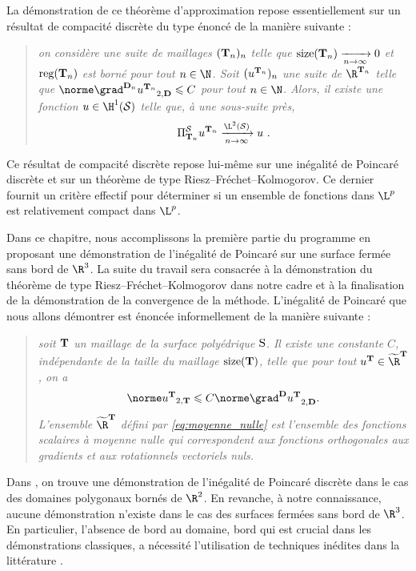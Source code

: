 La démonstration de ce théorème d'approximation repose essentiellement sur un résultat de compacité discrète du type \cite[Lemma 3.6]{andreianov_discrete_2007} énoncé de la manière suivante :
\begin{quote}
\textsl{on considère une suite de maillages $(\mathbf{T}_n)_n$ telle que $\operatorname{size}(\mathbf{T}_n) \xrightarrow[n \to \infty]{} 0$ et $\operatorname{reg}(\mathbf{T}_n)$ est borné pour tout $n \in \N$. Soit $(u^{\mathbf{T}_n})_n$ une suite de $\R^{\ensddfvplat_n}$ telle que $\normeddfvD{\grad^{\ensdiamantplat_n} u^{\ensddfvplat_n}} \leqslant C$ pour tout $n \in \N$. Alors, il existe une fonction $u \in \H^1(\surflisse)$ telle que, à une sous-suite près,
\[
\Pi^\surflisse_{\ensddfvplat_n} u^{\ensddfvplat_n} \xrightarrow[n \to \infty]{\L^2(\surflisse)} u\ .
\]
}
\end{quote}
Ce résultat de compacité discrète repose lui-même sur une inégalité de Poincaré discrète et sur un théorème de type Riesz--Fréchet--Kolmogorov. Ce dernier fournit un critère effectif pour déterminer si un ensemble de fonctions dans $\L^p$ est relativement compact dans $\L^p$. 

Dans ce chapitre, nous accomplissons la première partie du programme en proposant une démonstration de l'inégalité de Poincaré \ddfv sur une surface fermée sans bord de $\R^3$. La suite du travail sera consacrée à la démonstration du théorème de type Riesz--Fréchet--Kolmogorov dans notre cadre et à la finalisation de la démonstration de la convergence de la méthode. L'inégalité de Poincaré que nous allons démontrer est énoncée informellement de la manière suivante :
\begin{quote}
\textsl{soit $\mathbf{T}$ un maillage \ddfv de la surface polyédrique $\mathrm{S}$. Il existe une constante $C$, indépendante de la taille du maillage $\operatorname{size}(\mathbf{T})$, telle que pour tout $u^\ensddfvplat \in \Rddfvmn$, on a
\begin{equation*}
    \normeddfvT{u^\ensddfvplat} \leqslant C \normeddfvD{\grad^\ensdiamantplat u^\ensddfvplat}.
\end{equation*}
L'ensemble $\Rddfvmn$ défini par \ref{eq:moyenne_nulle} est l'ensemble des fonctions scalaires \ddfv à moyenne nulle qui correspondent aux fonctions orthogonales aux gradients et aux rotationnels vectoriels nuls.
}
\end{quote}

Dans \cite[Lemma 3.2]{andreianov_discrete_2007}, on trouve une démonstration de l'inégalité de Poincaré discrète dans le cas des domaines polygonaux bornés de $\R^2$. En revanche, à notre connaissance, aucune démonstration n'existe dans le cas des surfaces fermées sans bord de $\R^3$. En particulier, l'absence de bord au domaine, bord qui est crucial dans les démonstrations classiques, a nécessité l'utilisation de techniques inédites dans la littérature \ddfv. \\

